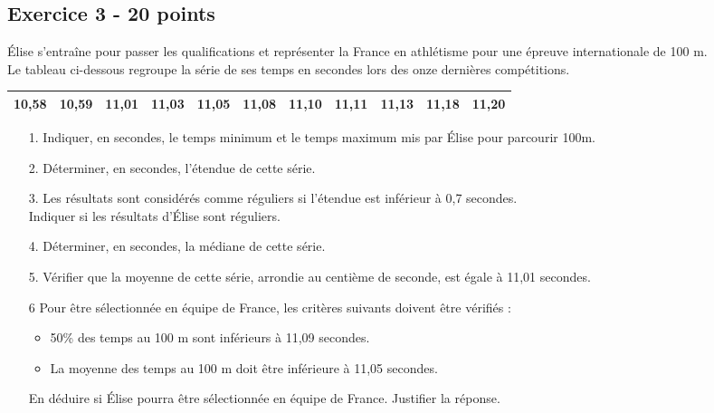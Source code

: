 \subsection*{Exercice 3 - 20 points }

Élise s'entraîne pour passer les qualifications et représenter la France en athlétisme pour une épreuve internationale de 100 m. \\

Le tableau ci-dessous regroupe la série de ses temps en secondes lors des onze dernières compétitions. \\

\begin{center}\begin{tabular}{|*{11}{c|}}
  \hline
  10,58 & 10,59 & 11,01 & 11,03 & 11,05 & 11,08 & 11,10 & 11,11 & 11,13 & 11,18 & 11,20 \\
  \hline
\end{tabular}\end{center}

\begin{enumerate}
  \item[1.] Indiquer, en secondes, le temps minimum et le temps maximum mis par Élise pour parcourir 100m. \\
  \item[2.] Déterminer, en secondes, l'étendue de cette série. \\
  \item[3.] Les résultats sont considérés comme réguliers si l'étendue est inférieur à 0,7 secondes.\\
  Indiquer si les résultats d'Élise sont réguliers. \\
  \item[4.] Déterminer, en secondes, la médiane de cette série. \\
  \item[5.] Vérifier que la moyenne de cette série, arrondie au centième de seconde, est égale à 11,01 secondes. \\
  \item[6] Pour être sélectionnée en équipe de France, les critères suivants doivent être vérifiés : 
  \begin{itemize}
    \item 50\% des temps au 100 m sont inférieurs à 11,09 secondes.
    \item La moyenne des temps au 100 m doit être inférieure à 11,05 secondes.
  \end{itemize}
  En déduire si Élise pourra être sélectionnée en équipe de France. Justifier la réponse. 
\end{enumerate}
 
